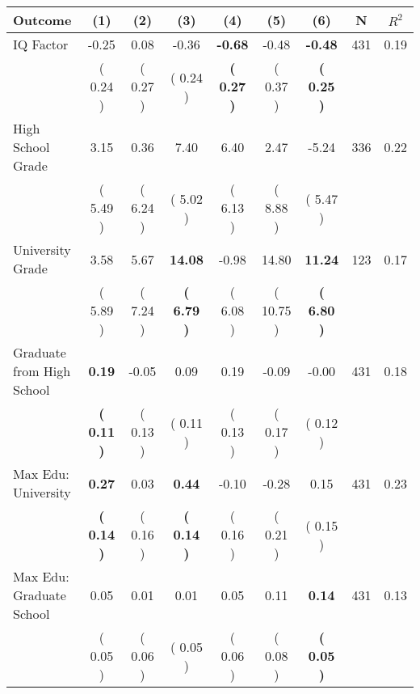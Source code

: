 \begin{tabular}{lcccccccc}
\toprule
 \textbf{Outcome} & \textbf{(1)} & \textbf{(2)} & \textbf{(3)} & \textbf{(4)} & \textbf{(5)} & \textbf{(6)} & \textbf{N} & \textbf{$ R^2$} \\
\midrule
IQ Factor &     -0.25 &      0.08 &     -0.36 & \textbf{    -0.68} &     -0.48 & \textbf{    -0.48} & 431 &       0.19 \\ 
 & (     0.24 ) & (     0.27 ) & (     0.24 ) & \textbf{(     0.27 )} & (     0.37 ) & \textbf{(     0.25 )} & \\
High School Grade &      3.15 &      0.36 &      7.40 &      6.40 &      2.47 &     -5.24 & 336 &       0.22 \\ 
 & (     5.49 ) & (     6.24 ) & (     5.02 ) & (     6.13 ) & (     8.88 ) & (     5.47 ) & \\
University Grade &      3.58 &      5.67 & \textbf{    14.08} &     -0.98 &     14.80 & \textbf{    11.24} & 123 &       0.17 \\ 
 & (     5.89 ) & (     7.24 ) & \textbf{(     6.79 )} & (     6.08 ) & (    10.75 ) & \textbf{(     6.80 )} & \\
Graduate from High School & \textbf{     0.19} &     -0.05 &      0.09 &      0.19 &     -0.09 &     -0.00 & 431 &       0.18 \\ 
 & \textbf{(     0.11 )} & (     0.13 ) & (     0.11 ) & (     0.13 ) & (     0.17 ) & (     0.12 ) & \\
Max Edu: University & \textbf{     0.27} &      0.03 & \textbf{     0.44} &     -0.10 &     -0.28 &      0.15 & 431 &       0.23 \\ 
 & \textbf{(     0.14 )} & (     0.16 ) & \textbf{(     0.14 )} & (     0.16 ) & (     0.21 ) & (     0.15 ) & \\
Max Edu: Graduate School &      0.05 &      0.01 &      0.01 &      0.05 &      0.11 & \textbf{     0.14} & 431 &       0.13 \\ 
 & (     0.05 ) & (     0.06 ) & (     0.05 ) & (     0.06 ) & (     0.08 ) & \textbf{(     0.05 )} & \\
\bottomrule
\end{tabular}
